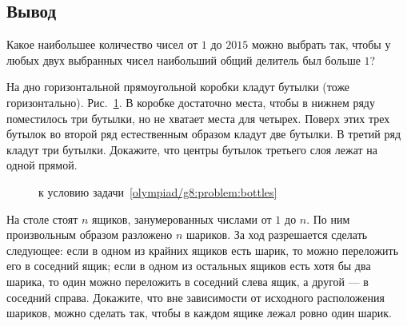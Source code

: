 \subsection*{Вывод}

\begin{problems}

\item
Какое наибольшее количество чисел от $1$ до $2015$ можно выбрать так, чтобы
у любых двух выбранных чисел наибольший общий делитель был больше $1$?

\item
\label{olympiad/g8:problem:bottles}%
На дно горизонтальной прямоугольной коробки кладут бутылки
(тоже горизонтально).
Рис.~\ref{olympiad/g8:problem:bottles:fig}.
В коробке достаточно места, чтобы в нижнем ряду поместилось три бутылки,
но не хватает места для четырех.
Поверх этих трех бутылок во второй ряд естественным образом кладут две бутылки.
В третий ряд кладут три бутылки.
Докажите, что центры бутылок третьего слоя лежат на одной прямой.

\begin{figure}[ht]\begin{center}
    \caption{к условию задачи~\ref{olympiad/g8:problem:bottles}}
    \label{olympiad/g8:problem:bottles:fig}
\end{center}\end{figure}

\item
На столе стоят $n$ ящиков, занумерованных числами от $1$ до $n$.
По ним произвольным образом разложено $n$ шариков.
За ход разрешается сделать следующее: если в одном из крайних ящиков есть
шарик, то можно переложить его в соседний ящик;
если в одном из остальных ящиков есть хотя бы два шарика, то один можно
переложить в соседний слева ящик, а другой --- в соседний справа.
Докажите, что вне зависимости от исходного расположения шариков, можно сделать
так, чтобы в каждом ящике лежал ровно один шарик.

\end{problems}

